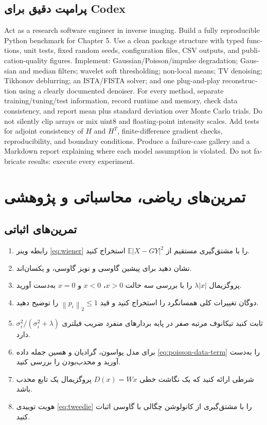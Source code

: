 \documentclass[12pt,openany,oneside]{book}
\newcommand{\E}{\mathbb{E}}
\newcommand{\norm}[1]{\left\lVert #1\right\rVert}
\begin{document}
\subsection{پرامپت دقیق برای Codex}
\begin{workshopbox}[پرامپت]
\begin{latin}
\small
Act as a research software engineer in inverse imaging. Build a fully reproducible Python
benchmark for Chapter 5. Use a clean package structure with typed functions, unit tests,
fixed random seeds, configuration files, CSV outputs, and publication-quality figures.
Implement: Gaussian/Poisson/impulse degradation; Gaussian and median filters; wavelet
soft thresholding; non-local means; TV denoising; Tikhonov deblurring; an ISTA/FISTA
solver; and one plug-and-play reconstruction using a clearly documented denoiser.
For every method, separate training/tuning/test information, record runtime and memory,
check data consistency, and report mean plus standard deviation over Monte Carlo trials.
Do not silently clip arrays or mix uint8 and floating-point intensity scales. Add tests for
adjoint consistency of $H$ and $H^T$, finite-difference gradient checks, reproducibility, and
boundary conditions. Produce a failure-case gallery and a Markdown report explaining
where each model assumption is violated. Do not fabricate results: execute every experiment.
\end{latin}
\end{workshopbox}

\section{تمرین‌های ریاضی، محاسباتی و پژوهشی}

\subsection*{تمرین‌های اثباتی}
\begin{enumerate}
\item رابطه وینر \eqref{eq:wiener} را با مشتق‌گیری مستقیم از \(\E|X-GY|^2\) استخراج کنید.
\item نشان دهید برای پیشین گاوسی و نویز گاوسی،  و  یکسان‌اند.
\item پروگزیمال \(\lambda|x|\) را با بررسی سه حالت \(x>0\)، \(x<0\) و \(x=0\) به‌دست آورید.
\item دوگان تغییرات کلی همسانگرد را استخراج کنید و قید \(\norm{p_i}_2\le1\) را توضیح دهید.
\item ثابت کنید تیکانوف مرتبه صفر در پایه بردارهای منفرد ضریب فیلتری \(\sigma_i^2/(\sigma_i^2+\lambda)\) دارد.
\item برای مدل پواسون، گرادیان و هسین جمله داده \eqref{eq:poisson-data-term} را به‌دست آورید و محدب‌بودن را بررسی کنید.
\item شرطی ارائه کنید که یک نگاشت خطی \(D(x)=Wx\) پروگزیمال یک تابع محدب باشد.
\item هویت توییدی \eqref{eq:tweedie} را با مشتق‌گیری از کانولوشن چگالی با گاوسی اثبات کنید.
\end{enumerate}
\end{document}
